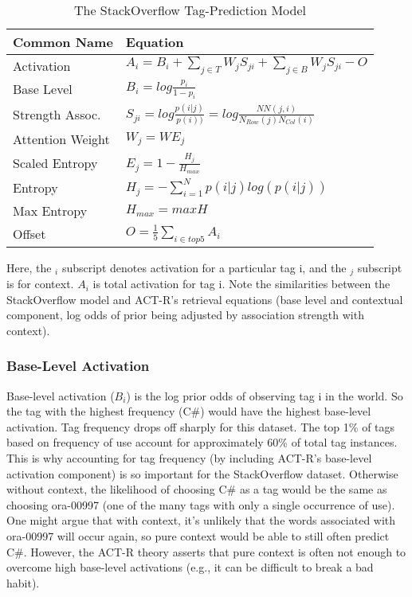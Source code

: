 \documentclass[10pt,letterpaper]{article}
\begin{document}
\renewcommand{\arraystretch}{1.5}%
\renewcommand{\tabcolsep}{.5mm}
\begin{table}[!ht]
  \begin{center} 
    \caption{The StackOverflow Tag-Prediction Model} 
    \label{sample-table} 
    \vskip 0.12in
    \begin{tabular}{ll} 
      \hline
      Common Name &  Equation \\
      \hline
      Activation & 		$A_{i} = B_{i} + \sum_{j\in T}^{ } W_{j} S_{ji} + \sum_{j\in B}^{ } W_{j} S_{ji} - O$ \\
      Base Level & 		$B_{i} = log \frac{p_{i}}{1-p_{i}}$ \\
      Strength Assoc. &		$S_{ji} = log \frac{p(i|j)}{p(i))} = log \frac{NN(j,i)}{N_{Row}(j)N_{Col}(i)}$ \\
      Attention Weight	& 	$W_{j} = WE_{j}$ \\
      Scaled Entropy & 		$E_{j} = 1-\frac{H_{j}}{H_{max}}$ \\
      Entropy & 		$H_{j} = -\sum_{i=1}^{N}p(i|j)log\left (  p(i|j) \right )$ \\
      Max Entropy & 		$H_{max} = maxH$ \\
      Offset & 			$O = \frac{1}{5}\sum_{i\in top 5}^{ } A_{i}$ \\
      \hline
    \end{tabular} 
  \end{center} 
\end{table}

Here, the $_{i}$ subscript denotes activation for a particular tag i, and the $_{j}$ subscript is for context.
$A_{i}$ is total activation for tag i.
Note the similarities between the StackOverflow model and ACT-R's retrieval equations (base level and contextual component, log odds of prior being adjusted by association strength with context).

\subsubsection{Base-Level Activation}

Base-level activation ($B_{i}$) is the log prior odds of observing tag i in the world.
So the tag with the highest frequency (C\#) would have the highest base-level activation.
Tag frequency drops off sharply for this dataset.
The top 1\% of tags based on frequency of use account for approximately 60\% of total tag instances.
This is why accounting for tag frequency (by including ACT-R's base-level activation component) is so important for the StackOverflow dataset.
Otherwise without context, the likelihood of choosing C\# as a tag would be the same as choosing ora-00997 (one of the many tags with only a single occurrence of use).
One might argue that with context, it's unlikely that the words associated with ora-00997 will occur again, so pure context would be able to still often predict C\#.
However, the ACT-R theory asserts that pure context is often not enough to overcome high base-level activations (e.g., it can be difficult to break a bad habit).
\end{document}
